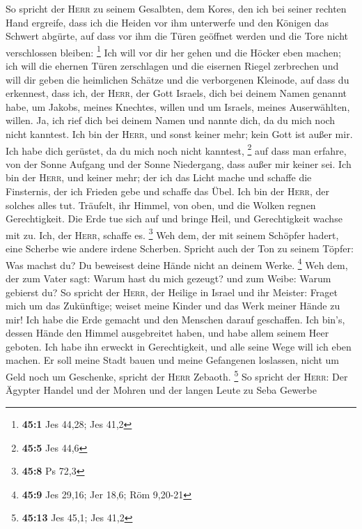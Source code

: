  So spricht der \textsc{Herr} zu seinem Gesalbten, dem
Kores, den ich bei seiner rechten Hand ergreife, dass ich die Heiden vor
ihm unterwerfe und den Königen das Schwert abgürte, auf dass vor ihm die
Türen geöffnet werden und die Tore nicht verschlossen bleiben:
\footnote{\textbf{45:1} Jes 44,28; Jes 41,2}  Ich will vor
dir her gehen und die Höcker eben machen; ich will die ehernen Türen
zerschlagen und die eisernen Riegel zerbrechen  und will
dir geben die heimlichen Schätze und die verborgenen Kleinode, auf dass
du erkennest, dass ich, der \textsc{Herr}, der Gott Israels, dich bei
deinem Namen genannt habe,  um Jakobs, meines Knechtes,
willen und um Israels, meines Auserwählten, willen. Ja, ich rief dich
bei deinem Namen und nannte dich, da du mich noch nicht kanntest.
 Ich bin der \textsc{Herr}, und sonst keiner mehr; kein
Gott ist außer mir. Ich habe dich gerüstet, da du mich noch nicht
kanntest, \footnote{\textbf{45:5} Jes 44,6}  auf dass man
erfahre, von der Sonne Aufgang und der Sonne Niedergang, dass außer mir
keiner sei. Ich bin der \textsc{Herr}, und keiner mehr; 
der ich das Licht mache und schaffe die Finsternis, der ich Frieden gebe
und schaffe das Übel. Ich bin der \textsc{Herr}, der solches alles tut.
 Träufelt, ihr Himmel, von oben, und die Wolken regnen
Gerechtigkeit. Die Erde tue sich auf und bringe Heil, und Gerechtigkeit
wachse mit zu. Ich, der \textsc{Herr}, schaffe es. \footnote{\textbf{45:8}
  Ps 72,3}  Weh dem, der mit seinem Schöpfer hadert, eine
Scherbe wie andere irdene Scherben. Spricht auch der Ton zu seinem
Töpfer: Was machst du? Du beweisest deine Hände nicht an deinem Werke.
\footnote{\textbf{45:9} Jes 29,16; Jer 18,6; Röm 9,20-21}
 Weh dem, der zum Vater sagt: Warum hast du mich gezeugt?
und zum Weibe: Warum gebierst du?  So spricht der
\textsc{Herr}, der Heilige in Israel und ihr Meister: Fraget mich um das
Zukünftige; weiset meine Kinder und das Werk meiner Hände zu mir!
 Ich habe die Erde gemacht und den Menschen darauf
geschaffen. Ich bin's, dessen Hände den Himmel ausgebreitet haben, und
habe allem seinem Heer geboten.  Ich habe ihn erweckt in
Gerechtigkeit, und alle seine Wege will ich eben machen. Er soll meine
Stadt bauen und meine Gefangenen loslassen, nicht um Geld noch um
Geschenke, spricht der \textsc{Herr} Zebaoth. \footnote{\textbf{45:13}
  Jes 45,1; Jes 41,2}  So spricht der \textsc{Herr}: Der
Ägypter Handel und der Mohren und der langen Leute zu Seba Gewerbe
